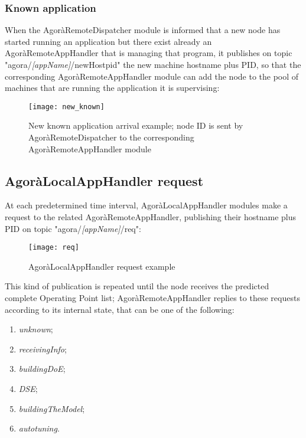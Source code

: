 \subsubsection{Known application}\label{knownApp}

When the AgoràRemoteDispatcher module is informed that a new node has started running an application but there exist already an AgoràRemoteAppHandler that is managing that program, it publishes on topic "agora/\textit{[appName]}/newHostpid" the new machine hostname plus PID, so that the corresponding Agorà\-Remote\-App\-Handler module can add the node to the pool of machines that are running the application it is supervising:

\begin{figure}[H]

    \centering
    \texttt{[image: new\_known]}
    \caption[New known application arrival example]{New known application arrival example; node ID is sent by AgoràRemoteDispatcher to the corresponding AgoràRemoteAppHandler module}
    
\end{figure}





\subsection{AgoràLocalAppHandler request}\label{clientReq}

At each predetermined time interval, AgoràLocalAppHandler modules make a request to the related AgoràRemoteAppHandler, publishing their hostname plus PID on topic "agora/\textit{[appName]}/req":

\begin{figure}[H]

    \centering
    \texttt{[image: req]}
    \caption{AgoràLocalAppHandler request example}
    
\end{figure}

This kind of publication is repeated until the node receives the predicted complete Operating Point list; AgoràRemoteAppHandler replies to these requests according to its internal state, that can be one of the following:

\begin{enumerate}

    \item \textit{unknown};

    \item \textit{receivingInfo};

    \item \textit{buildingDoE};

    \item \textit{DSE};

    \item \textit{buildingTheModel};

    \item \textit{autotuning}.

\end{enumerate}


